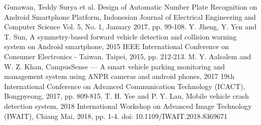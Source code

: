 \documentclass[12pt, a4paper]{article}
\begin{document}
\begin{thebibliography}{9}
 Gunawan, Teddy Surya et al. Design of Automatic Number Plate Recognition on Android Smartphone Platform, Indonesian Journal of Electrical Engineering and Computer Science
Vol. 5, No. 1, January 2017, pp. 99-108.
 Y. Jheng, Y. Yen and T. Sun, A symmetry-based forward vehicle detection and collision warning system on Android smartphone, 2015 IEEE International Conference on Consumer Electronics - Taiwan, Taipei, 2015, pp. 212-213.
 M. Y. Aalsalem and W. Z. Khan, CampusSense — A smart vehicle parking monitoring and management system using ANPR cameras and android phones, 2017 19th International Conference on Advanced Communication Technology (ICACT), Bongpyeong, 2017, pp. 809-815.
 T. H. Yee and P. Y. Lau, Mobile vehicle crash detection system, 2018 International Workshop on Advanced Image Technology (IWAIT), Chiang Mai, 2018, pp. 1-4.
doi: 10.1109/IWAIT.2018.8369671

\end{thebibliography}
\end{document}
